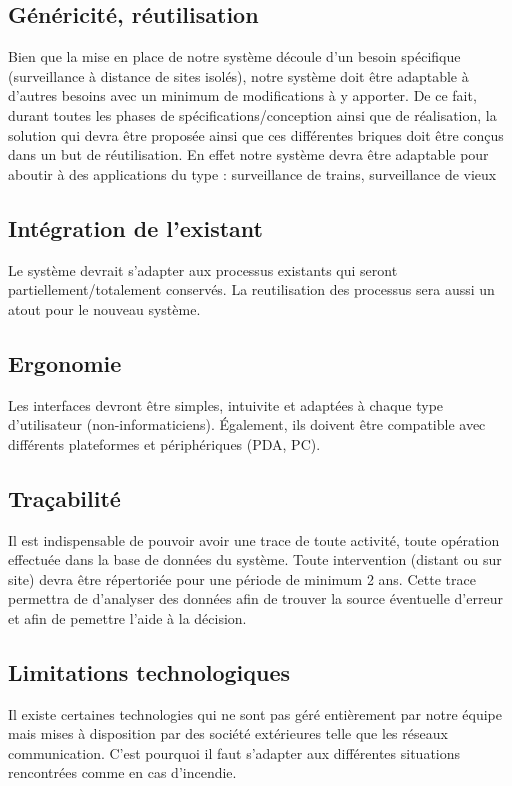 \subsection{Généricité, réutilisation}
Bien que la mise en place de notre système découle d'un besoin spécifique (surveillance à distance de sites 
isolés), notre système doit être adaptable à d'autres besoins avec un minimum de modifications à y apporter. De ce 
fait, durant toutes les phases de spécifications/conception ainsi que de réalisation, la solution qui devra être 
proposée ainsi que ces différentes briques doit être conçus dans un but de réutilisation. En effet notre système 
devra être adaptable pour aboutir à des applications du type : surveillance de trains, surveillance de vieux

\subsection{Intégration de l'existant}
Le système devrait s'adapter aux processus existants qui seront partiellement/totalement conservés.
La reutilisation des processus sera aussi un atout pour le nouveau système.

\subsection{Ergonomie}  
Les interfaces devront être simples, intuivite et adaptées à chaque type d’utilisateur (non-informaticiens). Également, ils doivent être compatible avec
différents plateformes et périphériques (PDA, PC).   

\subsection{Traçabilité} 
Il est indispensable de  pouvoir avoir une trace de toute activité, toute opération effectuée dans la base de données du système. 
Toute intervention (distant ou sur site) devra être répertoriée pour une période de minimum 2 ans. 
Cette trace permettra de d'analyser des données afin de trouver la source éventuelle d'erreur et afin de pemettre l'aide à la décision.


\subsection{Limitations technologiques}
Il existe certaines technologies qui ne sont pas géré entièrement par notre équipe mais mises à disposition par
des société extérieures telle que les réseaux communication. C'est pourquoi il faut s'adapter aux différentes situations rencontrées comme
en cas d'incendie. 
